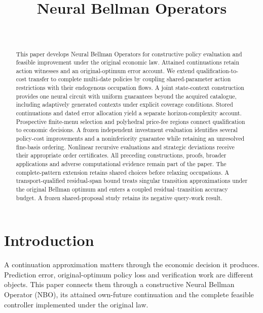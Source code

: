 \documentclass[ecta,nameyear,draft]{econsocart}
\begin{document}
\begin{frontmatter}
\title{Neural Bellman Operators}
\begin{aug}
\author[id=au1,addressref={add1}]{~}
\address[id=add1]{Peking University}
\end{aug}
\begin{abstract}
This paper develops Neural Bellman Operators for constructive policy evaluation and feasible improvement under the original economic law. Attained continuations retain action witnesses and an original-optimum error account. We extend qualification-to-cost transfer to complete multi-date policies by coupling shared-parameter action restrictions with their endogenous occupation flows. A joint state-context construction provides one neural circuit with uniform guarantees beyond the acquired catalogue, including adaptively generated contexts under explicit coverage conditions. Stored continuations and dated error allocation yield a separate horizon-complexity account. Prospective finite-menu selection and polyhedral price-fee regions connect qualification to economic decisions. A frozen independent investment evaluation identifies several policy-cost improvements and a noninferiority guarantee while retaining an unresolved fine-basis ordering. Nonlinear recursive evaluations and strategic deviations receive their appropriate order certificates. All preceding constructions, proofs, broader applications and adverse computational evidence remain part of the paper.
 The complete-pattern extension retains shared choices before relaxing occupations. A transport-qualified residual-span bound treats singular transition approximations under the original Bellman optimum and enters a coupled residual--transition accuracy budget. A frozen shared-proposal study retains its negative query-work result.
\end{abstract}
\begin{keyword}
\end{keyword}
\end{frontmatter}
\section{Introduction}\label{sec:introduction65}
A continuation approximation matters through the economic decision it produces. Prediction error, original-optimum policy loss and verification work are different objects. This paper connects them through a constructive Neural Bellman Operator (NBO), its attained own-future continuation and the complete feasible controller implemented under the original law.
\end{document}
